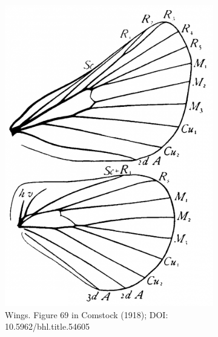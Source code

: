 \documentclass[letterpaper, 11pt]{article}
\begin{document}
\begin{figure}[ht!]
    \centering
    \begin{subfigure}[ht!]{0.3\textwidth}
        \includegraphics[width=\textwidth]{LasiocampidWings}
        \caption{Wings. Figure 69 in Comstock (1918); DOI: 10.5962/bhl.title.54605}
        \label{fig:lasiocampid1}
    \end{subfigure}
    \qquad %
    \begin{subfigure}[ht!]{0.31\textwidth}

\end{subfigure}
\end{figure}
\end{document}
